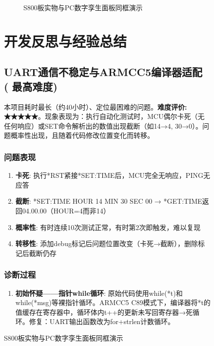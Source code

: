 \documentclass[12pt,hyperref,a4paper,UTF8]{ctexart}
\begin{document}
\begin{figure}[!htbp]
\begin{figure}[!htbp]
    \centering
    \caption{S800板实物与PC数字孪生面板同框演示}
    \label{fig:demo}
\end{figure}

\section{开发反思与经验总结}

\subsection{UART通信不稳定与ARMCC5编译器适配 \qquad (\faStar\,\faStar\,\faStar 最高难度)}

本项目耗时最长（约40小时）、定位最困难的问题。\textbf{难度评价: ★★★★★}。现象表现为：执行自动化测试时，MCU偶尔卡死（无任何响应）或SET命令解析出的数值出现截断（如14→4, 30→0）。问题概率性出现，且随着代码修改位置变化而转移。

\subsubsection{问题表现}

\begin{enumerate}
    \item \textbf{卡死}: 执行*RST紧接*SET:TIME后，MCU完全无响应，PING无应答
    \item \textbf{截断}: *SET:TIME HOUR 14 MIN 30 SEC 00 → *GET:TIME返回04.00.00（HOUR=4而非14）
    \item \textbf{概率性}: 有时连续10次测试正常，有时第2次即触发，难以复现
    \item \textbf{转移性}: 添加debug标记后问题位置改变（卡死→截断），删除标记后截断仍存
\end{enumerate}

\subsubsection{诊断过程}

\begin{enumerate}
    \item \textbf{初始怀疑——指针while循环}: 原始代码使用while(*t)和while(*msg)等裸指针循环。ARMCC5 C89模式下，编译器将*t的值缓存在寄存器中，循环体内t++的更新未写回寄存器→死循环。修复：UART输出函数改为for+strlen计数循环。


\end{enumerate}
\end{figure}
\end{document}
